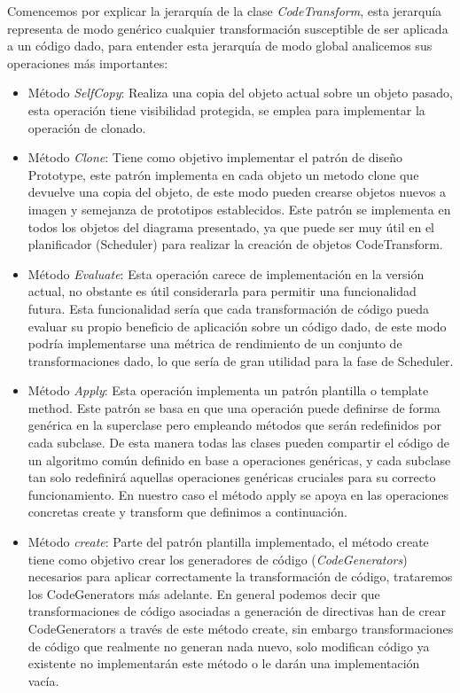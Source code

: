 Comencemos por explicar la jerarquía de la clase \textit{CodeTransform}, esta jerarquía representa de modo genérico cualquier transformación susceptible de ser aplicada a un código dado, para entender esta jerarquía de modo global analicemos sus operaciones más importantes:

\begin{itemize}

\item Método \textit{SelfCopy}: Realiza una copia del objeto actual sobre un objeto pasado, esta operación tiene visibilidad protegida, se emplea para implementar la operación de clonado.

\item Método \textit{Clone}: Tiene como objetivo implementar el patrón de diseño Prototype, este patrón implementa en cada objeto un metodo clone que devuelve una copia del objeto, de este modo pueden crearse objetos nuevos a imagen y semejanza de prototipos establecidos. Este patrón se implementa en todos los objetos del diagrama presentado, ya que puede ser muy útil en el planificador (Scheduler) para realizar la creación de objetos CodeTransform.

\item Método \textit{Evaluate}: Esta operación carece de implementación en la versión actual, no obstante  es útil considerarla para permitir una funcionalidad futura. Esta funcionalidad sería que cada transformación de código pueda evaluar su propio beneficio de aplicación sobre un código dado, de este modo podría implementarse una métrica de rendimiento de un conjunto de transformaciones dado, lo que sería de gran utilidad para la fase de Scheduler.

\item Método \textit{Apply}: Esta operación implementa un patrón plantilla o template method. Este patrón se basa en que una operación puede definirse de forma genérica en la superclase pero empleando métodos que serán redefinidos por cada subclase. De esta manera todas las clases pueden compartir el código de un algoritmo común definido en base a operaciones genéricas, y cada subclase tan solo redefinirá aquellas operaciones genéricas cruciales para su correcto funcionamiento. En nuestro caso el método apply se apoya en las operaciones concretas create y transform que definimos a continuación.

\item Método \textit{create}: Parte del patrón plantilla implementado, el método create tiene como objetivo crear los generadores de código (\textit{CodeGenerators}) necesarios para aplicar correctamente la transformación de código, trataremos los CodeGenerators más adelante.
En general podemos decir que transformaciones de código asociadas a generación de directivas han de crear CodeGenerators a través de este método create, sin embargo transformaciones de código que realmente no generan nada nuevo, solo modifican código ya existente no implementarán este método o le darán una implementación vacía.


\end{itemize}
